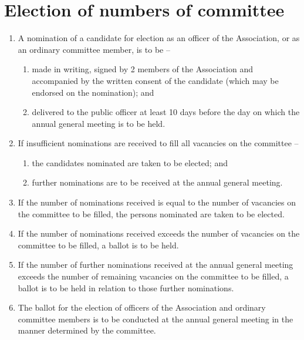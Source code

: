 \section{Election of numbers of committee}
\label{rule:election}

\begin{enumerate}
	\item A nomination of a candidate for election as an officer of the Association, or as an ordinary committee member, is to be --
	\begin{enumerate}
		\item made in writing, signed by 2 members of the Association and accompanied by the written consent of the candidate (which may be endorsed on the nomination); and
		\item delivered to the public officer at least 10 days before the day on which the annual general meeting is to be held.
	\end{enumerate}
	
	\item If insufficient nominations are received to fill all vacancies on the committee --
	\begin{enumerate}
		\item the candidates nominated are taken to be elected; and
		\item further nominations are to be received at the annual general meeting.
	\end{enumerate}
	
	\item If the number of nominations received is equal to the number of vacancies on the committee to be filled, the persons nominated are taken to be elected.
	\item If the number of nominations received exceeds the number of vacancies on the committee to be filled, a ballot is to be held.
	\item If the number of further nominations received at the annual general meeting exceeds the number of remaining vacancies on the committee to be filled, a ballot is to be held in relation to those further nominations.
	\item The ballot for the election of officers of the Association and ordinary committee members is to be conducted at the annual general meeting in the manner determined by the committee.
\end{enumerate}